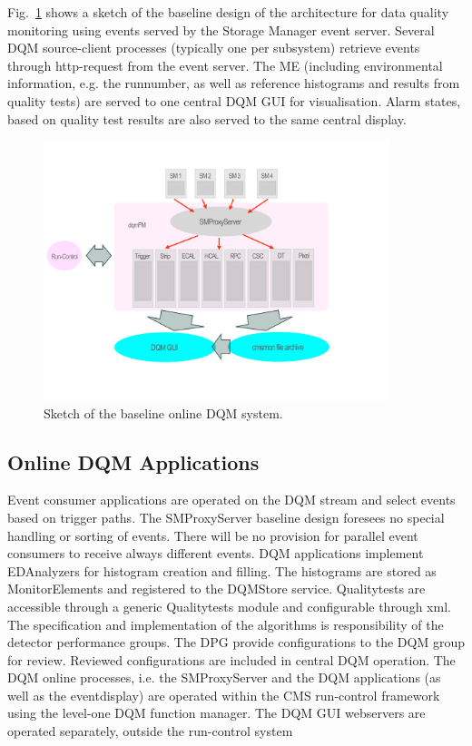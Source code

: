 Fig.~\ref{fig:overview} shows a sketch of the baseline design of the architecture for data quality monitoring using events served by the Storage Manager event server. Several DQM source-client processes (typically one per subsystem) retrieve events through http-request from the event server. The ME (including environmental information, e.g. the runnumber, as well as reference histograms and results from quality tests) are served to one central DQM GUI for visualisation. Alarm states, based on quality test results are also served to the same central display.

\begin{figure}[!htbp]
\begin{center}
\includegraphics[width=0.9\textwidth]{dqm_online}
\caption{Sketch of the baseline online DQM system.}
\end{center}
\label{fig:overview}
\end{figure}


\subsection{Online DQM Applications}

Event consumer applications are operated on the DQM stream and select events based on trigger paths. The SMProxyServer baseline design foresees no special handling or sorting of events. There will be no provision for parallel event consumers to receive always different events.
DQM applications implement EDAnalyzers for histogram creation and filling. The histograms are stored as MonitorElements and registered to the DQMStore service. Qualitytests are accessible through a generic Qualitytests module and configurable through xml. The specification and implementation of the algorithms is responsibility of the detector performance groups. The DPG provide configurations to the DQM group for review. Reviewed configurations are included in central DQM operation.
The DQM online processes, i.e. the SMProxyServer and the DQM applications (as well as the eventdisplay) are operated within the CMS run-control framework using the level-one DQM function manager. The DQM GUI webservers are operated separately, outside the run-control system

